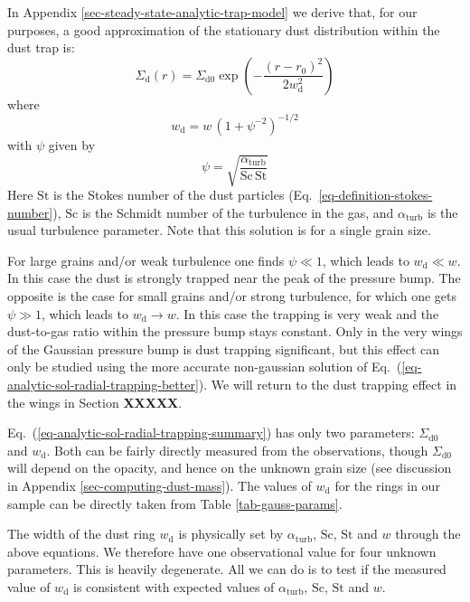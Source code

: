 \documentclass{aa}
\begin{document}
In Appendix \ref{sec-steady-state-analytic-trap-model} we derive that, for our
purposes, a good approximation of the stationary dust distribution within the
dust trap is:
\begin{equation}\label{eq-analytic-sol-radial-trapping-summary}
\Sigma_{\mathrm{d}}(r) = \Sigma_{\mathrm{d0}} \exp\left(-\frac{(r-r_0)^2}{2w_{\mathrm{d}}^2}\right)
\end{equation}
where
\begin{equation}\label{eq-wd-afo-w-psi}
  w_{\mathrm{d}} = w\,\left(1+\psi^{-2}\right)^{-1/2}
\end{equation}
with $\psi$ given by
\begin{equation}\label{eq-psi-afo-alpha-sc-st}
\psi = \sqrt{\frac{\alpha_{\mathrm{turb}}}{\mathrm{Sc}\,\mathrm{St}}}
\end{equation}
Here $\mathrm{St}$ is the Stokes number of the dust particles
(Eq.~\ref{eq-definition-stokes-number}), $\mathrm{Sc}$ is the Schmidt number of
the turbulence in the gas, and $\alpha_{\mathrm{turb}}$ is the usual turbulence
parameter. Note that this solution is for a single grain size.

For large grains and/or weak turbulence one finds $\psi\ll 1$, which leads to
$w_{\mathrm{d}}\ll w$. In this case the dust is strongly trapped near the peak
of the pressure bump. The opposite is the case for small grains and/or strong
turbulence, for which one gets $\psi\gg 1$, which leads to
$w_{\mathrm{d}}\rightarrow w$. In this case the trapping is very weak and the
dust-to-gas ratio within the pressure bump stays constant. Only in the very
wings of the Gaussian pressure bump is dust trapping significant, but this
effect can only be studied using the more accurate non-gaussian solution of
Eq.~(\ref{eq-analytic-sol-radial-trapping-better}). We will return to the dust
trapping effect in the wings in Section {\bf XXXXX}.

Eq.~(\ref{eq-analytic-sol-radial-trapping-summary}) has only two parameters:
$\Sigma_{\mathrm{d0}}$ and $w_{\mathrm{d}}$. Both can be fairly directly
measured from the observations, though $\Sigma_{\mathrm{d0}}$ will depend on the
opacity, and hence on the unknown grain size (see discussion in Appendix
\ref{sec-computing-dust-mass}). The values of $w_{\mathrm{d}}$ for
the rings in our sample can be directly taken from Table \ref{tab-gauss-params}.

The width of the dust ring $w_{\mathrm{d}}$ is physically set by
$\alpha_{\mathrm{turb}}$, $\mathrm{Sc}$, $\mathrm{St}$ and $w$ through the above
equations. We therefore
have one observational value for four unknown parameters. This is heavily
degenerate. All we can do is to test if the measured value of
$w_{\mathrm{d}}$ is consistent with expected values of $\alpha_{\mathrm{turb}}$,
$\mathrm{Sc}$, $\mathrm{St}$ and $w$.
\end{document}
